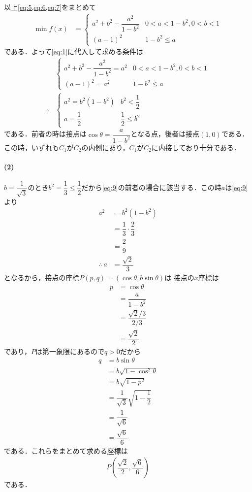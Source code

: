 \documentclass[../../main.tex]{subfiles}
\begin{document}
以上\cref{eq:5,eq:6,eq:7}をまとめて
\begin{align}
  \min f(x)
  &=
  \begin{cases}
    a^2+b^2 -\dfrac{a^2}{1-b^2} & 0< a <1-b^2, 0<b<1  \\
    (a-1)^2 & 1-b^2 \le a
  \end{cases} \label{eq:8}
\end{align}
である．よって\cref{eq:1}に代入して求める条件は
\begin{align}
  &
  \begin{cases}
    a^2+b^2 -\dfrac{a^2}{1-b^2} = a^2 & 0< a <1-b^2, 0<b<1 \\
    (a-1)^2 = a^2 & 1-b^2 \le a
  \end{cases} \\
  \therefore
  &
  \begin{cases}
    a^2 = b^2(1-b^2) & b^2 < \dfrac{1}{2} \\
    a = \dfrac{1}{2} & \dfrac{1}{2} \le b^2
  \end{cases} \label{eq:9}
\end{align}
である．前者の時は接点は$\cos\theta=\dfrac{a}{1-b^2}$となる点，後者は接点$(1,0)$である．
この時，いずれも$C_1$が$C_2$の内側にあり，$C_1$が$C_2$に内接しており十分である．

\paragraph{(2)}

$b=\dfrac{1}{\sqrt{3}}$のとき$b^2=\dfrac{1}{3}\le\dfrac{1}{2}$だから\cref{eq:9}の前者の場合に該当する．この時$a$は\cref{eq:9}より
\begin{align}
  a^2
  &=b^2(1-b^2) \\
  &=\dfrac{1}{3}\cdot\dfrac{2}{3} \\
  &=\dfrac{2}{9} \\
  \therefore\
  a&=\dfrac{\sqrt{2}}{3} \label{eq:10}
\end{align}
となるから，接点の座標$P(p,q)=(\cos\theta,b\sin\theta)$は
接点の$x$座標は
\begin{align}
  p &=\cos\theta \\
  &= \dfrac{a}{1-b^2} \\
  &=\dfrac{\sqrt{2}/3}{2/3} \\
  &=\dfrac{\sqrt{2}}{2}
\end{align}
であり，$P$は第一象限にあるので$q>0$だから
\begin{align}
  q &= b\sin\theta \\
  &= b\sqrt{1-\cos^2\theta} \\
  &= b\sqrt{1-p^2}  \\
  &=\dfrac{1}{\sqrt{3}}\sqrt{1-\dfrac{1}{2}} \\
  &=\dfrac{1}{\sqrt{6}} \\
  &=\dfrac{\sqrt{6}}{6}
\end{align}
である．これらをまとめて求める座標は
\begin{align}
  P\left(\dfrac{\sqrt{2}}{2},\dfrac{\sqrt{6}}{6}\right) \label{eq:11}
\end{align}
である．
\end{document}
